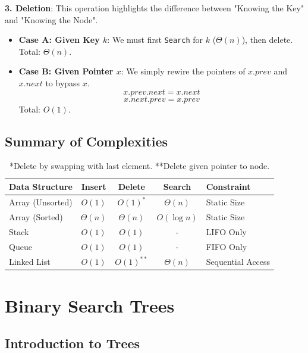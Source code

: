\documentclass[12pt]{article}
\theoremstyle{blueplain}
\theoremstyle{bluedef}
\theoremstyle{blueremark}
\begin{document}
\textbf{3. Deletion}:
This operation highlights the difference between "Knowing the Key" and "Knowing the Node".
\begin{itemize}
    \item \textbf{Case A: Given Key $k$}:
          We must first \texttt{Search} for $k$ ($\Theta(n)$), then delete. Total: $\Theta(n)$.
    \item \textbf{Case B: Given Pointer $x$}:
          We simply rewire the pointers of $x.prev$ and $x.next$ to bypass $x$.
          \[ x.prev.next = x.next \]
          \[ x.next.prev = x.prev \]
          Total: $O(1)$.
\end{itemize}

\subsection{Summary of Complexities}

\begin{table}[h]
    \centering
    \begin{tabular}{|l|c|c|c|l|}
        \hline
        \textbf{Data Structure} & \textbf{Insert} & \textbf{Delete} & \textbf{Search} & \textbf{Constraint} \\ \hline
        Array (Unsorted)        & $O(1)$          & $O(1)^*$        & $\Theta(n)$     & Static Size         \\ \hline
        Array (Sorted)          & $\Theta(n)$     & $\Theta(n)$     & $O(\log n)$     & Static Size         \\ \hline
        Stack                   & $O(1)$          & $O(1)$          & -               & LIFO Only           \\ \hline
        Queue                   & $O(1)$          & $O(1)$          & -               & FIFO Only           \\ \hline
        Linked List             & $O(1)$          & $O(1)^{**}$     & $\Theta(n)$     & Sequential Access   \\ \hline
    \end{tabular}
    \caption{*Delete by swapping with last element. **Delete given pointer to node.}
\end{table}

\clearpage


\section{Binary Search Trees}

\subsection{Introduction to Trees}
\end{document}
